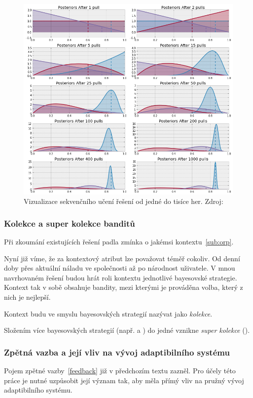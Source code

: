 \documentclass[thesis=M,czech]{FITthesis}[2014/05/07]
\begin{document}
\begin{figure}\centering
	\includegraphics[width=1.0\textwidth]{obr/posteriors.png}
 	\caption[Vizualizace sekvenčního učení řešení od jedné do tisíce her.]{Vizualizace sekvenčního učení řešení od jedné do tisíce her. Zdroj: \cite{camdp}}\label{fig:posteriors}
\end{figure}	

\subsubsection{Kolekce a super kolekce banditů}
Při zkoumání existujících řešení padla zmínka o jakémsi kontextu~\ref {sub:orp}.

Nyní již víme, že za kontextový atribut lze považovat téměř cokoliv. Od denní doby přes aktuální náladu ve společnosti až po národnost uživatele. V mnou navrhovaném řešení budou hrát roli kontextu jednotlivé bayesovské strategie. Kontext tak v sobě obsahuje bandity, mezi kterými je prováděna volba, který z nich je nejlepší. 

Kontext budu ve smyslu bayesovských strategií nazývat jako \emph{kolekce}.

Složením více bayesovských strategií (např.  a ) do jedné vznikne \emph{super kolekce} (). 

\subsubsection{Zpětná vazba a její vliv na vývoj adaptibilního systému}
\label{subsub:feedback}
Pojem zpětné vazby~\ref{feedback} již v předchozím textu zazněl. Pro účely této práce je nutné uzpůsobit její význam tak, aby měla přímý vliv na pružný vývoj adaptibilního systému.
\end{document}
